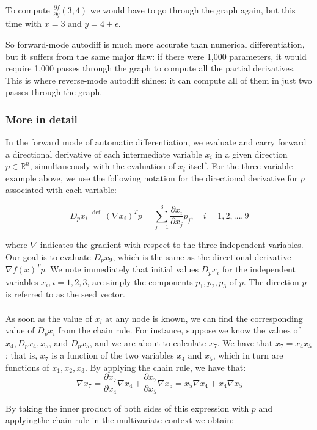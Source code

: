 To compute \(\frac{\partial f}{\partial y}(3, 4)\) we would have to go through the graph again, but this time with \(x = 3\) and \(y = 4 + \epsilon\).

So forward-mode autodiff is much more accurate than numerical differentiation, but it suffers from the same major flaw: if there were 1,000 parameters, it would require 1,000 passes through the graph to compute all the partial derivatives. This is where reverse-mode autodiff shines: it can compute all of them in just two passes through the graph.


\subsubsection*{More in detail}

In the forward mode of automatic differentiation, we evaluate and carry forward a directional derivative of each intermediate variable $x_{i}$ in a given direction $p \in \mathbb{R}^{n}$, simultaneously with the evaluation of $x_{i}$ itself. For the three-variable example above, we use the following notation for the directional derivative for $p$ associated with each variable:

$$
D_{p} x_{i} \stackrel{\text { def }}{=}\left(\nabla x_{i}\right)^{T} p=\sum_{j=1}^{3} \frac{\partial x_{i}}{\partial x_{j}} p_{j}, \quad i=1,2, \ldots, 9
$$

where $\nabla$ indicates the gradient with respect to the three independent variables. Our goal is to evaluate $D_{p} x_{9}$, which is the same as the directional derivative $\nabla f(x)^{T} p$. We note immediately that initial values $D_{p} x_{i}$ for the independent variables $x_{i}, i=1,2,3$, are simply the components $p_{1}, p_{2}, p_{3}$ of $p$. The direction $p$ is referred to as the seed vector.\\ \\
As soon as the value of $x_{i}$ at any node is known, we can find the corresponding value of $D_{p} x_{i}$ from the chain rule. For instance, suppose we know the values of $x_{4}, D_{p} x_{4}, x_{5}$, and $D_{p} x_{5}$, and we are about to calculate $x_{7}$. We have that $x_{7}=x_{4} x_{5}$; that is, $x_{7}$ is a function of the two variables $x_{4}$ and $x_{5}$, which in turn are functions of $x_{1}, x_{2}, x_{3}$. By applying the chain rule, we have that:
$$
\nabla x_{7}=\frac{\partial x_{7}}{\partial x_{4}} \nabla x_{4}+\frac{\partial x_{7}}{\partial x_{5}} \nabla x_{5}=x_{5} \nabla x_{4}+x_{4} \nabla x_{5}
$$

By taking the inner product of both sides of this expression with $p$ and applyingthe chain rule in the multivariate context we obtain:

